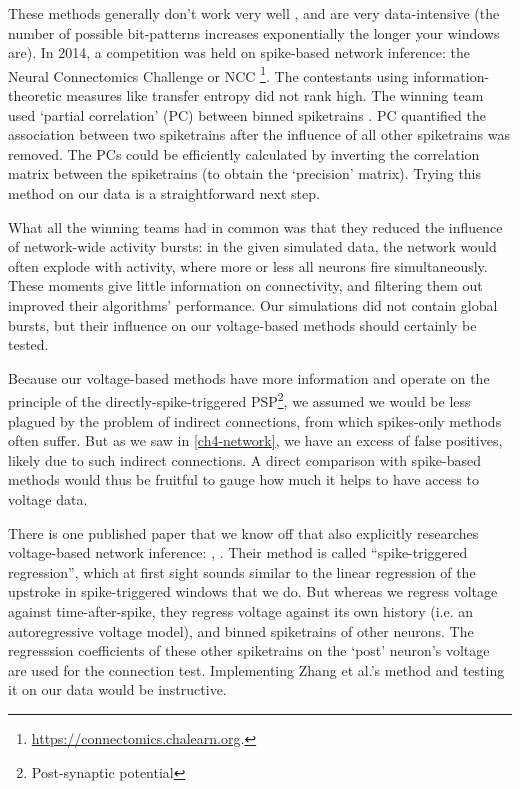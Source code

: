 These methods generally don't work very well \cite{Das2020SystematicErrorsConnectivity}, and are very data-intensive (the number of possible bit-patterns increases exponentially the longer your windows are). In 2014, a competition was held on spike-based network inference: the Neural Connectomics Challenge or NCC \cite{Guyon2014DesignFirstNeuronal,Orlandi2017FirstConnectomicsChallenge}\footnote{
    \url{https://connectomics.chalearn.org}.
}.
The contestants using information-theoretic measures like transfer entropy did not rank high.
The winning team used `partial correlation' (PC) between binned spiketrains \cite{Sutera2017SimpleConnectomeInference}.
PC quantified the association between two spiketrains after the influence of all other spiketrains was removed. The PCs could be efficiently calculated by inverting the correlation matrix between the spiketrains (to obtain the `precision' matrix).
Trying this method on our data is a straightforward next step.

What all the winning teams had in common was that they reduced the influence of network-wide activity bursts: in the given simulated data, the network would often explode with activity, where more or less all neurons fire simultaneously. These moments give little information on connectivity, and filtering them out improved their algorithms' performance.
Our simulations did not contain global bursts, but their influence on our voltage-based methods should certainly be tested.

Because our voltage-based methods have more information and operate on the principle of the directly-spike-triggered PSP\footnote{Post-synaptic potential}, we assumed we would be less plagued by the problem of indirect connections, from which spikes-only methods often suffer. But as we saw in \cref{ch4-network}, we have an excess of false positives, likely  due to such indirect connections. A direct comparison with spike-based methods would thus be fruitful to gauge how much it helps to have access to voltage data.

There is one published paper that we know off that also explicitly researches voltage-based network inference: , \cite{Zhang2017SpikeTriggeredRegressionSynaptic}.
Their method is called ``spike-triggered regression'', which at first sight sounds similar to the linear regression of the upstroke in spike-triggered windows that we do. But whereas we regress voltage against time-after-spike, they regress voltage against its own history (i.e. an autoregressive voltage model), and binned spiketrains of other neurons.
The regresssion coefficients of these other spiketrains on the `post' neuron's voltage are used for the connection test.
Implementing Zhang et al.'s method and testing it on our data would be instructive.


